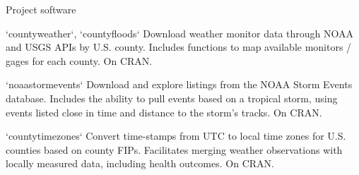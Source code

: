 \documentclass[ignorenonframetext,]{beamer}
\begin{document}
\begin{frame}{Project software}

\footnotesize

\begin{block}{`countyweather`, `countyfloods`}
Download weather monitor data through NOAA and USGS APIs by U.S. county. Includes functions to map available monitors / gages for each county. On CRAN.
\end{block}

\footnotesize

\begin{block}{`noaastormevents`}
Download and explore listings from the NOAA Storm Events database. Includes the ability to pull events based on a tropical storm, using events listed close in time and distance to the storm's tracks. On CRAN.
\end{block}

\footnotesize

\begin{block}{`countytimezones`}
Convert time-stamps from UTC to local time zones for U.S. counties based on county FIPs. Facilitates merging weather observations with locally measured data, including health outcomes. On CRAN.
\end{block}

\end{frame}
\end{document}
